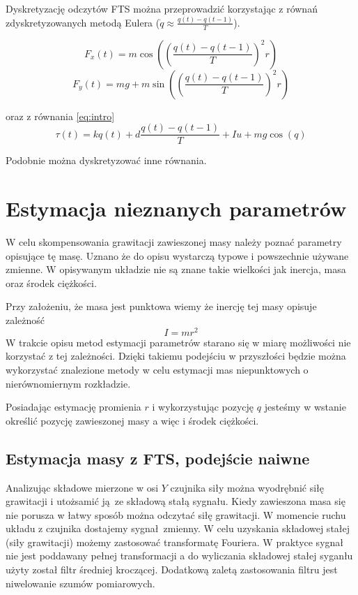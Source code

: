 \documentclass[a4paper, 10pt]{article}
\begin{document}
Dyskretyzację odczytów FTS można przeprowadzić korzystając z równań zdyskretyzowanych metodą Eulera ($\dot{q} \approx \frac{q(t)-q(t-1)}{T}$). 

\begin{equation}
F_x(t) = m\cos{((\frac{q(t)-q(t-1)}{T})^2 r)}
\end{equation}
\begin{equation}
\label{eq:fy}
F_y(t) = mg + m\sin{((\frac{q(t)-q(t-1)}{T})^2 r)}
\end{equation}

oraz z równania \ref{eq:intro}
\begin{equation}
\tau(t) = kq(t) + d\frac{q(t)-q(t-1)}{T} + Iu + mg\cos(q)
\end{equation}

Podobnie można dyskretyzować inne równania.
\section{Estymacja nieznanych parametrów}
W celu skompensowania grawitacji zawieszonej masy należy poznać parametry opisujące tę masę. Uznano że do opisu wystarczą typowe i powszechnie używane zmienne. W opisywanym układzie nie są znane takie wielkości jak inercja, masa oraz środek ciężkości. 

Przy założeniu, że masa jest punktowa wiemy że inercję tej masy opisuje zależność
\begin{equation}
I = mr^2
\end{equation}
W trakcie opisu metod estymacji parametrów starano się w miarę możliwości nie korzystać z tej zależności. Dzięki takiemu podejściu w przyszłości będzie można wykorzystać znalezione metody w celu estymacji mas niepunktowych o nierównomiernym rozkładzie. 

Posiadając estymację promienia $r$ i wykorzystując pozycję $q$ jesteśmy w wstanie określić pozycję zawieszonej masy a więc i środek ciężkości.


\subsection{Estymacja masy z FTS, podejście naiwne}
\label{fts:nai}
Analizując składowe mierzone w osi $Y$ czujnika siły można wyodrębnić siłę grawitacji i utożsamić ją ze składową stałą sygnału. Kiedy zawieszona masa się nie porusza w łatwy sposób można odczytać siłę grawitacji. W momencie ruchu układu z czujnika dostajemy sygnał zmienny. W celu uzyskania składowej stałej (siły grawitacji) możemy zastosować transformatę Fouriera. W praktyce sygnał nie jest poddawany pełnej transformacji a do wyliczania składowej stałej syganłu użyty został filtr średniej kroczącej. Dodatkową zaletą zastosowania filtru jest niwelowanie szumów pomiarowych.
\end{document}
